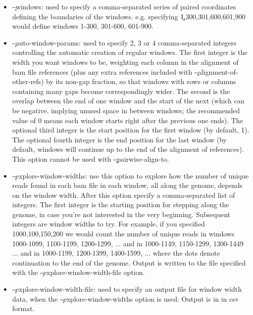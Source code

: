 \begin{itemize}
\item \c{--windows}: used to specify a comma-separated series of paired coordinates defining the boundaries of the windows.
e.g. specifying \c{1,300,301,600,601,900} would define windows 1-300, 301-600, 601-900.
\item \c{--auto-window-params}: used to specify 2, 3 or 4 comma-separated integers controlling the automatic creation of regular windows.
The first integer is the width you want windows to be, weighting each column in the alignment of bam file references (plus any extra references included with \c{--alignment-of-other-refs}) by its non-gap fraction, so that windows with rows or columns containing many gaps become correspondingly wider.
The second is the overlap between the end of one window and the start of the next (which can be negative, implying unused space in between windows; the recommended value of 0 means each window starts right after the previous one ends).
The optional third integer is the start position for the first window (by default, 1).
The optional fourth integer is the end position for the last window (by default, windows will continue up to the end of the alignment of references).
This option cannot be used with \c{--pairwise-align-to}.
\item \c{--explore-window-widths}: use this option to explore how the number of unique reads found in each bam file in each window, all along the genome, depends on the window width.
After this option specify a comma-separated list of integers.
The first integer is the starting position for stepping along the genome, in case you're not interested in the very beginning.
Subsequent integers are window widths to try.
For example, if you specified 1000,100,150,200 we would count the number of unique reads in windows 1000-1099, 1100-1199, 1200-1299, ... and in 1000-1149, 1150-1299, 1300-1449 ... and in 1000-1199, 1200-1399, 1400-1599, ... where the dots denote continuation to the end of the genome.
Output is written to the file specified with the \c{--explore-window-width-file} option.
\item \c{--explore-window-width-file}: used to specify an output file for window width data, when the \c{--explore-window-widths} option is used.
Output is in in csv format.
\end{itemize}

